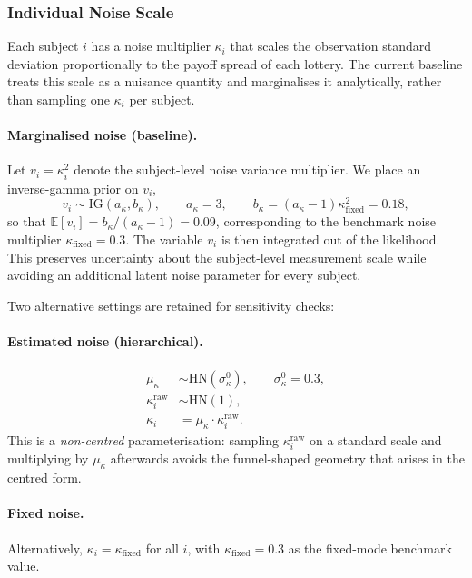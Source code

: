 \documentclass[12pt, a4paper]{article}
\newcommand{\E}{\mathbb{E}}
\newcommand{\HN}{\mathrm{HN}}
\newcommand{\IG}{\mathrm{IG}}
\newcommand{\ksi}{\kappa}
\begin{document}
\subsubsection{Individual Noise Scale}

Each subject $i$ has a noise multiplier $\ksi_i$ that scales the observation
standard deviation proportionally to the payoff spread of each lottery.  The
current baseline treats this scale as a nuisance quantity and marginalises it
analytically, rather than sampling one $\ksi_i$ per subject.

\paragraph{Marginalised noise (baseline).}
Let $v_i = \ksi_i^2$ denote the subject-level noise variance multiplier.  We
place an inverse-gamma prior on $v_i$,
\begin{equation}
  v_i \sim \IG(a_\ksi, b_\ksi),
  \qquad a_\ksi = 3,\qquad
  b_\ksi = (a_\ksi - 1)\ksi_{\mathrm{fixed}}^2 = 0.18,
  \label{eq:prior_ksi_ig}
\end{equation}
so that $\E[v_i] = b_\ksi/(a_\ksi-1) = 0.09$, corresponding to the benchmark
noise multiplier $\ksi_{\mathrm{fixed}} = 0.3$.  The variable $v_i$ is then
integrated out of the likelihood.  This preserves uncertainty about the
subject-level measurement scale while avoiding an additional latent noise
parameter for every subject.

Two alternative settings are retained for sensitivity checks:

\paragraph{Estimated noise (hierarchical).}
\begin{align}
  \mu_\ksi  &\sim \HN(\sigma_\ksi^0), \qquad \sigma_\ksi^0 = 0.3,
  \label{eq:prior_mu_ksi}\\
  \ksi_i^{\mathrm{raw}} &\sim \HN(1),
  \label{eq:prior_ksi_raw}\\
  \ksi_i    &= \mu_\ksi \cdot \ksi_i^{\mathrm{raw}}.
  \label{eq:ksi_noncentered}
\end{align}
This is a \emph{non-centred} parameterisation: sampling $\ksi_i^{\mathrm{raw}}$
on a standard scale and multiplying by $\mu_\ksi$ afterwards avoids the
funnel-shaped geometry that arises in the centred form.

\paragraph{Fixed noise.}
Alternatively, $\ksi_i = \ksi_{\mathrm{fixed}}$ for all $i$, with
$\ksi_{\mathrm{fixed}} = 0.3$ as the fixed-mode benchmark value.
\end{document}
